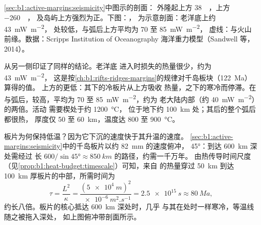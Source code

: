 \begin{omfigure}
{\cref{sec:b1:active-margins:seismicity}中图示的剖面：
外隆起上方 \qty{38}{\milli\gal}，上方 \qty{-260}{\milli\gal}，
及岛屿上方强烈为正。下图：，
为示意剖面：老洋底上约 \qty{43}{mW.m^{-2}}，
处较低，与弧后上方平均为 70 至 \qty{85}{mW.m^{-2}}，
虚线：与火山前缘。数据：Scripps
Institution of Oceanography 海洋重力模型（Sandwell 等，2014）。}
\label{fig:b1:active-margins:profiles}
\end{omfigure}

从另一侧印证了同样的结论。老洋底
进入时损失的热量很少，约为 \qty{43}{mW.m^{-2}}，
这是按\cref{ch:b1:rifts-ridges-margins}的规律对千岛板块（\qty{122}{Ma}）算得的值。
上方的更低：其下的冷板片从上方吸收
热量，之下的寒冷而停滞。在
与弧后，较高，平均为 70 至 \qty{85}{mW.m^{-2}}，约为
老大陆内部（约 \qty{40}{mW.m^{-2}}）的两倍。活动
需要楔处于约 \qty{1200}{\celsius}，
位于地下约 \qty{100}{km} 处；其后的整个弧后都很热，
厚度仅 50 至 \qty{60}{km}，温度达 800 至 \qty{900}{\celsius}。

板片为何保持低温？因为它下沉的速度快于其升温的速度。
\cref{sec:b1:active-margins:seismicity}中的千岛板片以约
\qty{82}{mm} 的速度俯冲， \ang{45}：到达 \qty{600}{km} 深处需经过
长 $600/\sin\ang{45} \approx \qty{850}{km}$ 的路径，约需一千万年。
由热传导时间尺度（见\cref{prop:b1:heat-budget:timescale}）可知，来自
的热量穿过 \qty{50}{km} 到达 \qty{100}{km} 厚板片的中部，所需时间为
\[
  \tau = \frac{L^2}{\kappa} = \frac{(\qty{5e4}{m})^2}{\qty{e-6}{m^2.s^{-1}}}
  = \qty{2.5e15}{s} \approx \qty{80}{Ma},
\]
约长八倍。板片的核心抵达 \qty{600}{km} 深处时，几乎
与其在处时一样寒冷，等温线随之被拖入深处，
如上图俯冲带剖面所示。

